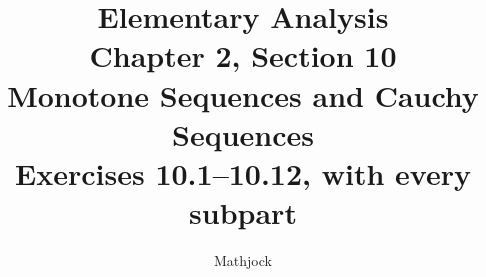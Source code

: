 
\title{\textbf{Elementary Analysis}\\[0.3em]
Chapter 2, Section 10\\[0.3em]
\large Monotone Sequences and Cauchy Sequences\\
Exercises 10.1--10.12, with every subpart}
\author{Mathjock}
\date{}

\maketitle
\bookinfo
\tableofcontents
\clearpage
\setcounter{section}{9}


